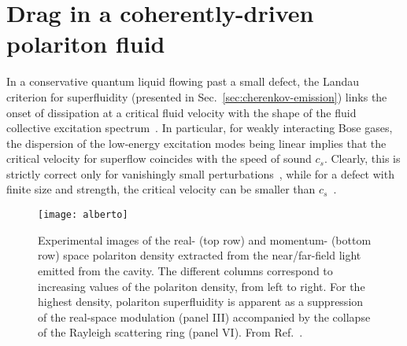 

\chapter{Drag in a coherently-driven polariton fluid}
\label{cha:drag}

In a conservative quantum liquid flowing past a small defect, the
Landau criterion for superfluidity (presented in
Sec.~\ref{sec:cherenkov-emission}) links the onset of dissipation at a
critical fluid velocity with the shape of the fluid collective
excitation spectrum~\cite{9780198507192}. In particular, for weakly
interacting Bose gases, the dispersion of the low-energy excitation
modes being linear implies that the critical velocity for superflow
coincides with the speed of sound $c_s$. Clearly, this is strictly
correct only for vanishingly small
perturbations~\cite{Astrakharchik_2004}, while for a defect with
finite size and strength, the critical velocity can be smaller than
$c_s$~\cite{Onofrio_2000,Ianeselli_2006}.
%
\begin{figure}[tb]\centering
  \texttt{[image: alberto]}
  \caption{
    Experimental images of the real- (top row) and momentum- (bottom
    row) space polariton density extracted from the near/far-field light
    emitted from the cavity. The different columns correspond to
    increasing values of the polariton density, from left to right. For
    the highest density, polariton superfluidity is apparent as a
    suppression of the real-space modulation (panel III) accompanied by
    the collapse of the Rayleigh scattering ring (panel VI).
    From Ref.~\cite{Amo_2009}.
  }\label{fig:alberto}
\end{figure}
% 

